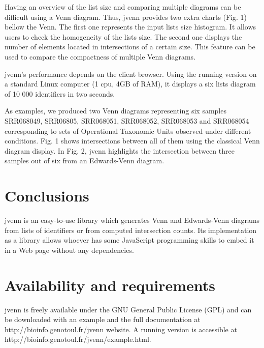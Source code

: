 \documentclass{bmcart}
\begin{document}
Having an overview of the list size and comparing multiple diagrams can be
difficult using a Venn diagram. Thus, jvenn provides two extra charts (Fig. 1) 
bellow the Venn. The first one represents the input lists size histogram. It
allows users to check the homogeneity of the lists size. The second one
displays the number of elements located in intersections of a certain size. This feature can
be used to compare the compactness of multiple Venn diagrams.

jvenn's performance depends on the client browser. Using the running version
on a standard Linux computer (1 cpu, 4GB of RAM), it displays a six lists diagram of 
10 000 identifiers in two seconds.

As examples, we produced two Venn diagrams representing six samples SRR068049,
SRR06805, SRR068051, SRR068052, SRR068053 and SRR068054 corresponding to sets of
Operational Taxonomic Units observed under different conditions. Fig. 1 shows
intersections between all of them using the classical Venn diagram display.
In Fig. 2, jvenn highlights the intersection between three samples out of six
from an Edwards-Venn diagram.


\section*{Conclusions}

jvenn is an easy-to-use library which generates Venn and Edwards-Venn diagrams
from lists of identifiers or from computed intersection counts. Its
implementation as a library allows whoever has some JavaScript programming
skills to embed it in a Web page without any dependencies.

\section*{Availability and requirements}

jvenn is freely available under the GNU General Public License (GPL) and can be
downloaded with an example and the full documentation at
http://bioinfo.genotoul.fr/jvenn  website. A running version is accessible at
http://bioinfo.genotoul.fr/jvenn/example.html.

\end{document}
